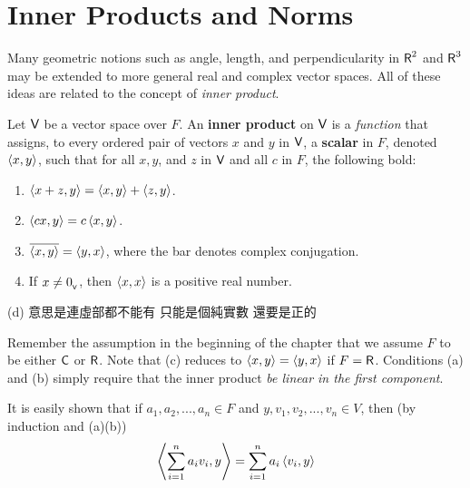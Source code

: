 \section{Inner Products and Norms} \label{sec 6.1}

Many geometric notions such as angle, length, and perpendicularity in \(\textsf{R}^2\) and \(\textsf{R}^3\) may be extended to more general real and complex vector spaces.
All of these ideas are related to the concept of \emph{inner product}.

\begin{definition} \label{def 6.1}
Let \(\textsf{V}\) be a vector space over \(F\).
An \textbf{inner product} on \(\textsf{V}\) is a \emph{function} that assigns, to every ordered pair of vectors \(x\) and \(y\) in \(\textsf{V}\), a \textbf{scalar} in \(F\), denoted \(\left< x, y \right>\), such that for all \(x, y\), and \(z\) in \(\textsf{V}\) and all \(c\) in \(F\), the following bold:
\begin{enumerate}
\item \(\left< x + z, y \right> = \left< x, y \right> + \left< z, y \right>\).
\item \(\left< cx, y \right> = c \left< x, y \right>\).
\item \(\overline{\left< x, y \right>} = \left< y, x \right>\), where the bar denotes complex conjugation.
\item If \(x \ne 0_{_{\textsf{V}}}\), then \(\left< x, x \right>\) is a positive real number.
\end{enumerate}
\end{definition}

\begin{note}
(d) 意思是連虛部都不能有
只能是個純實數 還要是正的
\end{note}

\begin{remark} \label{remark 6.1.1}
Remember the assumption in the beginning of the chapter that we assume \(F\) to be either \(\textsf{C}\) or \(\textsf{R}\).
Note that (c) reduces to \(\left< x, y \right> = \left< y, x \right>\) if \(F = \textsf{R}\).
Conditions (a) and (b) simply require that the inner product \emph{be linear in the first component}.

It is easily shown that if \(a_1, a_2, ..., a_n \in F\) and \(y, v_1, v_2, ..., v_n \in V\), then (by induction and (a)(b))
\[
    \left< \sum_{i = 1}^n a_i v_i, y \right> = \sum_{i = 1}^n a_i \left< v_i, y \right>
\]
\end{remark}

